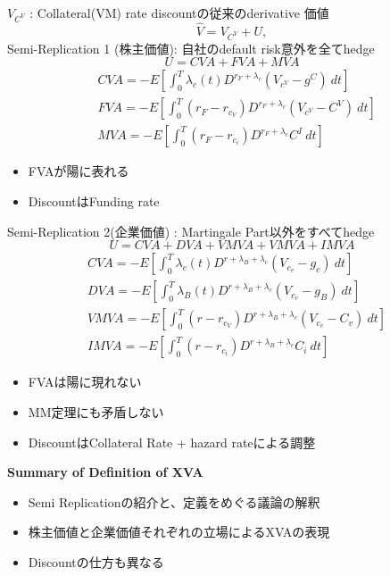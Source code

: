 \documentclass[driverfallback=dvipdfmx,cjk]{beamer}
\begin{document}
\begin{frame}
    $V_{C^V}$ : Collateral(VM) rate discountの従来のderivative 価値
    $$ \hat{V} = V_{C^V} + U,$$  
    Semi-Replication 1 (株主価値): 自社のdefault risk意外を全てhedge
   $$ U = CVA + FVA + MVA $$
   \begin{align*}
    &CVA = -E[\int_0^T \lambda_c(t) D^{r_F + \lambda_c}(V_{c^V}-g^C) \ dt]\\
    &FVA = -E[\int_0^T (r_F - r_{c_V}) D^{r_F + \lambda_c}(V_{c^V}-C^V) \ dt]\\
    &MVA = -E[\int_0^T (r_F - r_{c_i}) D^{r_F + \lambda_c}C^I \  dt]
   \end{align*}
   \begin{itemize}
       \item FVAが陽に表れる
       \item DiscountはFunding rate 
   \end{itemize}
\end{frame}


\begin{frame}
    Semi-Replication 2(企業価値) : Martingale Part以外をすべてhedge
   $$ U = CVA + DVA + VMVA + VMVA + IMVA$$
   \begin{align*}
    &CVA = -E[\int_0^T \lambda_c(t) D^{r + \lambda_B + \lambda_c}(V_{c_v}-g_c) \ dt]\\
    &DVA = -E[\int_0^T \lambda_B(t) D^{r + \lambda_B + \lambda_c}(V_{c_v}-g_B) \ dt]\\
    &VMVA = -E[\int_0^T (r - r_{c_V}) D^{r + \lambda_B + \lambda_c}(V_{c_v}-C_v) \ dt]\\
    &IMVA = -E[\int_0^T (r - r_{c_i}) D^{r + \lambda_B + \lambda_c} C_i \  dt]
   \end{align*}
   \begin{itemize}
       \item FVAは陽に現れない
       \item MM定理にも矛盾しない
       \item DiscountはCollateral Rate + hazard rateによる調整
   \end{itemize}
\end{frame}

\begin{frame}
\textbf{Summary of Definition of XVA}
\begin{itemize}
    \item Semi Replicationの紹介と、定義をめぐる議論の解釈
    \item 株主価値と企業価値それぞれの立場によるXVAの表現
    \item Discountの仕方も異なる
\end{itemize}
\end{frame}
\end{document}

